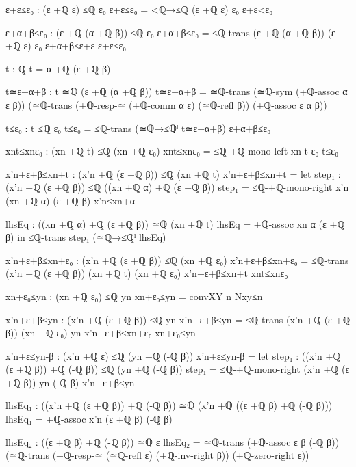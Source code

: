 \documentclass[11pt,a4paper]{book}
\begin{document}
\begin{code}
{                ε+ε≤ε₀ : (ε +ℚ ε) ≤ℚ ε₀
                ε+ε≤ε₀ = <ℚ→≤ℚ {(ε +ℚ ε)} {ε₀} ε+ε<ε₀

                ε+α+β≤ε₀ : (ε +ℚ (α +ℚ β)) ≤ℚ ε₀
                ε+α+β≤ε₀ = ≤ℚ-trans {(ε +ℚ (α +ℚ β))} {(ε +ℚ ε)} {ε₀} ε+α+β≤ε+ε ε+ε≤ε₀

                t : ℚ
                t = α +ℚ (ε +ℚ β)

                t≃ε+α+β : t ≃ℚ (ε +ℚ (α +ℚ β))
                t≃ε+α+β =
                  ≃ℚ-trans
                    (≃ℚ-sym (+ℚ-assoc α ε β))
                    (≃ℚ-trans
                      (+ℚ-resp-≃ (+ℚ-comm α ε) (≃ℚ-refl β))
                      (+ℚ-assoc ε α β))

                t≤ε₀ : t ≤ℚ ε₀
                t≤ε₀ = ≤ℚ-trans (≃ℚ→≤ℚˡ t≃ε+α+β) ε+α+β≤ε₀

                xnt≤xnε₀ : (xn +ℚ t) ≤ℚ (xn +ℚ ε₀)
                xnt≤xnε₀ = ≤ℚ-+ℚ-mono-left xn t ε₀ t≤ε₀

                x'n+ε+β≤xn+t : (x'n +ℚ (ε +ℚ β)) ≤ℚ (xn +ℚ t)
                x'n+ε+β≤xn+t =
                  let
                    step₁ : (x'n +ℚ (ε +ℚ β)) ≤ℚ ((xn +ℚ α) +ℚ (ε +ℚ β))
                    step₁ = ≤ℚ-+ℚ-mono-right x'n (xn +ℚ α) (ε +ℚ β) x'n≤xn+α

                    lhsEq : ((xn +ℚ α) +ℚ (ε +ℚ β)) ≃ℚ (xn +ℚ t)
                    lhsEq = +ℚ-assoc xn α (ε +ℚ β)
                  in
                  ≤ℚ-trans step₁ (≃ℚ→≤ℚˡ lhsEq)

                x'n+ε+β≤xn+ε₀ : (x'n +ℚ (ε +ℚ β)) ≤ℚ (xn +ℚ ε₀)
                x'n+ε+β≤xn+ε₀ = ≤ℚ-trans {(x'n +ℚ (ε +ℚ β))} {(xn +ℚ t)} {(xn +ℚ ε₀)} x'n+ε+β≤xn+t xnt≤xnε₀

                xn+ε₀≤yn : (xn +ℚ ε₀) ≤ℚ yn
                xn+ε₀≤yn = convXY n Nxy≤n

                x'n+ε+β≤yn : (x'n +ℚ (ε +ℚ β)) ≤ℚ yn
                x'n+ε+β≤yn = ≤ℚ-trans {(x'n +ℚ (ε +ℚ β))} {(xn +ℚ ε₀)} {yn} x'n+ε+β≤xn+ε₀ xn+ε₀≤yn

                x'n+ε≤yn-β : (x'n +ℚ ε) ≤ℚ (yn +ℚ (-ℚ β))
                x'n+ε≤yn-β =
                  let
                    step₁ : ((x'n +ℚ (ε +ℚ β)) +ℚ (-ℚ β)) ≤ℚ (yn +ℚ (-ℚ β))
                    step₁ = ≤ℚ-+ℚ-mono-right (x'n +ℚ (ε +ℚ β)) yn (-ℚ β) x'n+ε+β≤yn

                    lhsEq₁ : ((x'n +ℚ (ε +ℚ β)) +ℚ (-ℚ β)) ≃ℚ (x'n +ℚ ((ε +ℚ β) +ℚ (-ℚ β)))
                    lhsEq₁ = +ℚ-assoc x'n (ε +ℚ β) (-ℚ β)

                    lhsEq₂ : ((ε +ℚ β) +ℚ (-ℚ β)) ≃ℚ ε
                    lhsEq₂ =
                      ≃ℚ-trans
                        (+ℚ-assoc ε β (-ℚ β))
                        (≃ℚ-trans
                          (+ℚ-resp-≃ (≃ℚ-refl ε) (+ℚ-inv-right β))
                          (+ℚ-zero-right ε))

}
\end{code}
\end{document}
